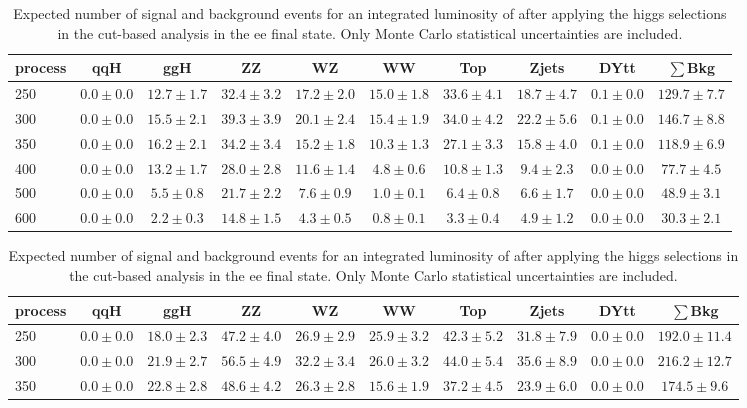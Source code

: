 \begin{table}
{\footnotesize
 \begin{center}
 \begin{tabular}{l | c c | c c c c c c c }
 \hline
 process & qqH & ggH & ZZ & WZ & WW & Top & Zjets & DYtt & $\sum$Bkg \\
 \hline
250 & $0.0\pm0.0$ & $12.7\pm1.7$ & $32.4\pm3.2$ & $17.2\pm2.0$ & $15.0\pm1.8$ & $33.6\pm4.1$ & $18.7\pm4.7$ & $0.1\pm0.0$ & $129.7\pm7.7$ \\
300 & $0.0\pm0.0$ & $15.5\pm2.1$ & $39.3\pm3.9$ & $20.1\pm2.4$ & $15.4\pm1.9$ & $34.0\pm4.2$ & $22.2\pm5.6$ & $0.1\pm0.0$ & $146.7\pm8.8$ \\
350 & $0.0\pm0.0$ & $16.2\pm2.1$ & $34.2\pm3.4$ & $15.2\pm1.8$ & $10.3\pm1.3$ & $27.1\pm3.3$ & $15.8\pm4.0$ & $0.1\pm0.0$ & $118.9\pm6.9$ \\
400 & $0.0\pm0.0$ & $13.2\pm1.7$ & $28.0\pm2.8$ & $11.6\pm1.4$ & $4.8\pm0.6$ & $10.8\pm1.3$ & $9.4\pm2.3$ & $0.0\pm0.0$ & $77.7\pm4.5$ \\
500 & $0.0\pm0.0$ & $5.5\pm0.8$ & $21.7\pm2.2$ & $7.6\pm0.9$ & $1.0\pm0.1$ & $6.4\pm0.8$ & $6.6\pm1.7$ & $0.0\pm0.0$ & $48.9\pm3.1$ \\
600 & $0.0\pm0.0$ & $2.2\pm0.3$ & $14.8\pm1.5$ & $4.3\pm0.5$ & $0.8\pm0.1$ & $3.3\pm0.4$ & $4.9\pm1.2$ & $0.0\pm0.0$ & $30.3\pm2.1$ \\
\hline
\end{tabular}
\label{tab:yield_cutbased_ee}
\end{center}
}
\caption{\fixme Expected number of signal and background events for an 
  integrated luminosity of \intlumi after applying the higgs selections in the cut-based analysis in the ee final state. 
  Only Monte Carlo statistical uncertainties are included. }
{\footnotesize
 \begin{center}
 \begin{tabular}{l | c c |  c c c c c c c }
 \hline
 process & qqH & ggH & ZZ & WZ & WW & Top & Zjets & DYtt & $\sum$Bkg \\
 \hline
250 & $0.0\pm0.0$ & $18.0\pm2.3$ & $47.2\pm4.0$ & $26.9\pm2.9$ & $25.9\pm3.2$ & $42.3\pm5.2$ & $31.8\pm7.9$ & $0.0\pm0.0$ & $192.0\pm11.4$ \\
300 & $0.0\pm0.0$ & $21.9\pm2.7$ & $56.5\pm4.9$ & $32.2\pm3.4$ & $26.0\pm3.2$ & $44.0\pm5.4$ & $35.6\pm8.9$ & $0.0\pm0.0$ & $216.2\pm12.7$ \\
350 & $0.0\pm0.0$ & $22.8\pm2.8$ & $48.6\pm4.2$ & $26.3\pm2.8$ & $15.6\pm1.9$ & $37.2\pm4.5$ & $23.9\pm6.0$ & $0.0\pm0.0$ & $174.5\pm9.6$ \\

\end{tabular}
\end{center}}
\end{table}
